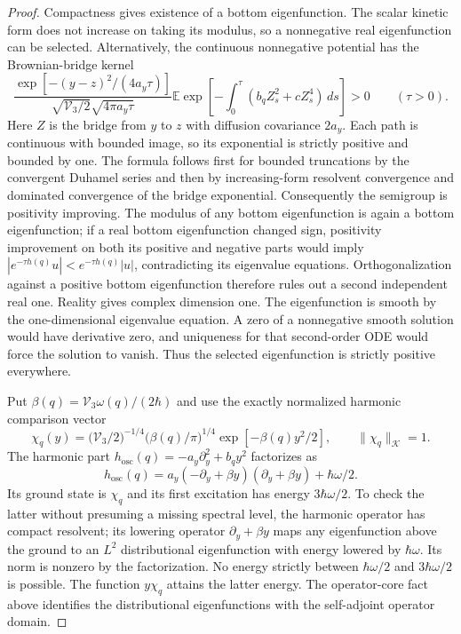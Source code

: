 \begin{proof}
Compactness gives existence of a bottom eigenfunction. The scalar
kinetic form does not increase on taking its modulus, so a
nonnegative real eigenfunction can be selected. Alternatively, the
continuous nonnegative potential has the Brownian-bridge kernel
\[
 \frac{\exp[-(y-z)^2/(4a_y\tau)]}
 {\sqrt{\mathcal V_3/2}\sqrt{4\pi a_y\tau}}
 \mathbb E\exp\left[-\int_0^\tau
    (b_qZ_s^2+cZ_s^4)\,ds\right]>0\qquad(\tau>0).
\]
Here $Z$ is the bridge from $y$ to $z$ with diffusion covariance
$2a_y$. Each path is continuous with bounded image, so its
exponential is strictly positive and bounded by one. The formula
follows first for bounded truncations by the convergent Duhamel
series and then by increasing-form resolvent convergence and
dominated convergence of the bridge exponential. Consequently the
semigroup is positivity improving. The modulus of any bottom
eigenfunction is again a bottom eigenfunction; if a real bottom
eigenfunction changed sign, positivity improvement on both its
positive and negative parts would imply
$|e^{-\tau h(q)}u|<e^{-\tau h(q)}|u|$, contradicting its eigenvalue
equations. Orthogonalization against a positive bottom eigenfunction
therefore rules out a second independent real one. Reality gives
complex dimension one. The eigenfunction is smooth by the
one-dimensional eigenvalue equation. A zero of a nonnegative smooth
solution would have derivative zero, and uniqueness for that
second-order ODE would force the solution to vanish. Thus the
selected eigenfunction is strictly positive everywhere.

Put $\beta(q)=\mathcal V_3\omega(q)/(2\hbar)$ and use the exactly
normalized harmonic comparison vector
\[
 \chi_q(y)=\bigl(\mathcal V_3/2\bigr)^{-1/4}
       \bigl(\beta(q)/\pi\bigr)^{1/4}
       \exp[-\beta(q)y^2/2],\qquad
 \|\chi_q\|_{\mathscr K}=1.
\]
The harmonic part $h_{\mathrm{osc}}(q)=-a_y\partial_y^2+b_qy^2$
factorizes as
\[
 h_{\mathrm{osc}}(q)
 =a_y(-\partial_y+\beta y)(\partial_y+\beta y)
       +\hbar\omega/2.
\]
Its ground state is $\chi_q$ and its first excitation has energy
$3\hbar\omega/2$. To check the latter without presuming a missing
spectral level, the harmonic operator has compact resolvent; its
lowering operator $\partial_y+\beta y$ maps any eigenfunction above
the ground to an $L^2$ distributional eigenfunction with energy
lowered by $\hbar\omega$. Its norm is nonzero by the factorization.
No energy strictly between $\hbar\omega/2$ and $3\hbar\omega/2$
is possible. The function $y\chi_q$ attains the latter energy.
The operator-core fact above identifies the distributional
eigenfunctions with the self-adjoint operator domain.


\end{proof}
